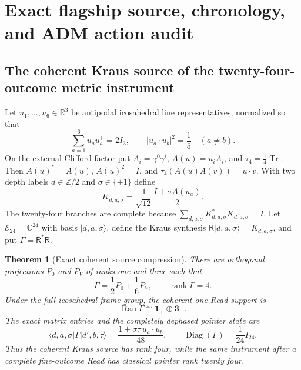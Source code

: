 \documentclass[11pt]{article}
\newtheorem{theorem}{Theorem}[section]
\theoremstyle{definition}
\theoremstyle{remark}
\newcommand{\R}{\mathbb R}
\newcommand{\C}{\mathbb C}
\newcommand{\Tr}{\operatorname{Tr}}
\newcommand{\rank}{\operatorname{rank}}
\newcommand{\Ztwo}{\mathbb Z/2}
\newcommand{\Ran}{\operatorname{Ran}}
\begin{document}
\section{Exact flagship source, chronology, and ADM action audit}
\label{sec:flagship-source-chronology}

\subsection{The coherent Kraus source of the twenty-four-outcome metric instrument}

Let $u_1,\ldots,u_6\in\R^3$ be antipodal icosahedral line representatives,
normalized so that
\[
 \sum_{a=1}^6u_au_a^{\mathsf T}=2I_3,
 \qquad |u_a\cdot u_b|^2=\frac15\quad(a\ne b).
\]
On the external Clifford factor put $A_i=\gamma^0\gamma^i$,
$A(u)=u_iA_i$, and $\tau_4=\tfrac14\Tr$.  Then
$A(u)^*=A(u)$, $A(u)^2=I$, and
$\tau_4(A(u)A(v))=u\cdot v$.  With two depth labels $d\in\Ztwo$ and
$\sigma\in\{\pm1\}$ define
\[
 K_{d,a,\sigma}
 =\frac1{\sqrt{12}}\frac{I+\sigma A(u_a)}2.
\]
The twenty-four branches are complete because
$\sum_{d,a,\sigma}K_{d,a,\sigma}^*K_{d,a,\sigma}=I$.
Let $\mathcal E_{24}=\C^{24}$ with basis $|d,a,\sigma\rangle$, define the Kraus
synthesis $\mathsf R|d,a,\sigma\rangle=K_{d,a,\sigma}$, and put
$\Gamma=\mathsf R^*\mathsf R$.

\begin{theorem}[Exact coherent source compression]
\label{thm:flagship-kraus-source-master}
There are orthogonal projections $P_0$ and $P_V$ of ranks one and three such
that
\[
 \boxed{\Gamma=\frac12P_0+\frac16P_V,\qquad\rank\Gamma=4.}
\]
Under the full icosahedral frame group, the coherent one-Read support is
\[
 \boxed{\Ran\Gamma\cong\mathbf1_+\oplus\mathbf3_-.}
\]
The exact matrix entries and the completely dephased pointer state are
\[
 \boxed{
 \langle d,a,\sigma|\Gamma|d',b,\tau\rangle
 =\frac{1+\sigma\tau\,u_a\cdot u_b}{48},
 \qquad
 \operatorname{Diag}(\Gamma)=\frac1{24}I_{24}.}
\]
Thus the coherent Kraus source has rank four, while the same instrument after a
complete fine-outcome Read has classical pointer rank twenty four.
\end{theorem}
\end{document}
